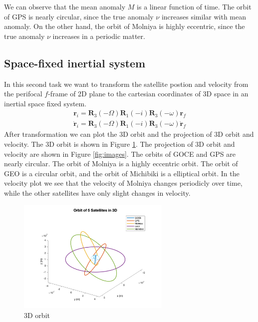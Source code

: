 \documentclass[12pt
,headinclude
,headsepline
,bibtotocnumbered
]{scrartcl}
\begin{document}
We can observe that the mean anomaly $M$ is a linear function of time. The orbit of GPS is nearly circular, since the true anomaly $\nu$ increases similar with mean anomaly. On the other hand, the orbit of Molniya is highly eccentric, since the true anomaly $\nu$ increases in a periodic matter. 
\subsection*{Space-fixed inertial system}
In this second task we want to transform the satellite postion and velocity from the perifocal $f$-frame of 2D plane to the cartesian coordinates of 3D space in an inertial space fixed system. 
\begin{align*}
    \boldsymbol{r}_i=\boldsymbol{R}_3(-\Omega)\boldsymbol{R}_1(-i)\boldsymbol{R}_3(-\omega)\boldsymbol{r}_f\\
    \dot{\boldsymbol{r}}_i=\boldsymbol{R}_3(-\Omega)\boldsymbol{R}_1(-i)\boldsymbol{R}_3(-\omega)\dot{\boldsymbol{r}}_f
\end{align*}
After transformation we can plot the 3D orbit and the projection of 3D orbit and velocity. The 3D orbit is shown in Figure \ref{fig:3D_orbit}. The projection of 3D orbit and velocity are shown in Figure \ref{fig:images}. The orbits of GOCE and GPS are nearly circular. The orbit of Molniya is a highly eccentric orbit. The orbit of GEO is a circular orbit, and the orbit of Michibiki is a elliptical orbit. In the velocity plot we see that the velocity of Molniya changes periodicly over time, while the other satellites have only slight changes in velocity. 
\begin{figure}[H]
    \centering
    \includegraphics[width=0.65\textwidth]{plots/orb3d.png}
    \caption{3D orbit}
    \label{fig:3D_orbit}
\end{figure}
\end{document}
